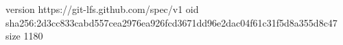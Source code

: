 version https://git-lfs.github.com/spec/v1
oid sha256:2d3cc833cabd557cea2976ea926fcd3671dd96e2dac04f61c31f5d8a355d8c47
size 1180
